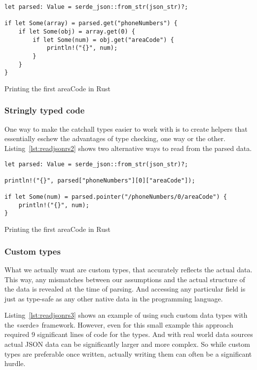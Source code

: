 \begin{listing}[ht!]
\begin{verbatim}
let parsed: Value = serde_json::from_str(json_str)?;

if let Some(array) = parsed.get("phoneNumbers") {
    if let Some(obj) = array.get(0) {
        if let Some(num) = obj.get("areaCode") {
            println!("{}", num);
        }
    }
}
\end{verbatim}
\caption{Printing the first areaCode in Rust}
\label{lst:readjsonrs1}
\end{listing}


\subsubsection{Stringly typed code}

One way to make the catchall types easier to work with is to create helpers that essentially eschew the advantages of type checking, one way or the other. Listing~\ref{lst:readjsonrs2} shows two alternative ways to read from the parsed data. \morestuff

\begin{listing}[ht!]
\begin{verbatim}
let parsed: Value = serde_json::from_str(json_str)?;

println!("{}", parsed["phoneNumbers"][0]["areaCode"]);

if let Some(num) = parsed.pointer("/phoneNumbers/0/areaCode") {
    println!("{}", num);
}
\end{verbatim}
\caption{Printing the first areaCode in Rust}
\label{lst:readjsonrs2}
\end{listing}

\subsubsection{Custom types}

What we actually want are custom types, that accurately reflects the actual data. This way, any mismatches between our assumptions and the actual structure of the data is revealed at the time of parsing. And accessing any particular field is just as type-safe as any other native data in the programming language.

Listing~\ref{lst:readjsonrs3} shows an example of using such custom data types with the «serde» framework. However, even for this small example this approach required 9 significant lines of code for the types. And with real world data sources actual JSON data can be significantly larger and more complex. So while custom types are preferable once written, actually writing them can often be a significant hurdle.

